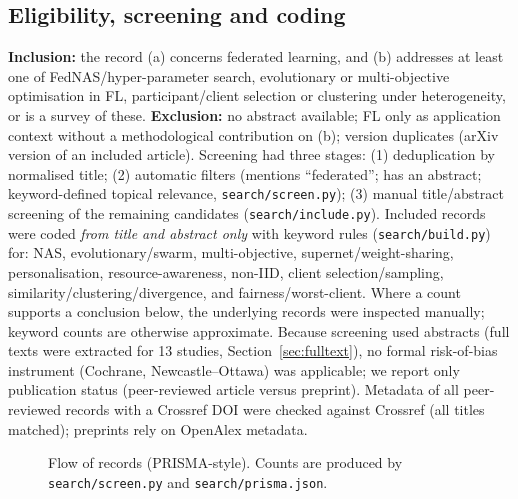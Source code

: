 \documentclass[11pt,a4paper]{article}
\begin{document}
\subsection{Eligibility, screening and coding}
\textbf{Inclusion:} the record (a) concerns federated learning, and (b) addresses at least one of FedNAS/hyper-parameter search, evolutionary or multi-objective optimisation in FL, participant/client selection or clustering under heterogeneity, or is a survey of these. \textbf{Exclusion:} no abstract available; FL only as application context without a methodological contribution on (b); version duplicates (arXiv version of an included article). Screening had three stages: (1) deduplication by normalised title; (2) automatic filters (mentions ``federated''; has an abstract; keyword-defined topical relevance, \texttt{search/screen.py}); (3) manual title/abstract screening of the \paftertopicalfilter{} remaining candidates (\texttt{search/include.py}). Included records were coded \emph{from title and abstract only} with keyword rules (\texttt{search/build.py}) for: NAS, evolutionary/swarm, multi-objective, supernet/weight-sharing, personalisation, resource-awareness, non-IID, client selection/sampling, similarity/clustering/divergence, and fairness/worst-client. Where a count supports a conclusion below, the underlying records were inspected manually; keyword counts are otherwise approximate. Because screening used abstracts (full texts were extracted for 13 studies, Section~\ref{sec:fulltext}), no formal risk-of-bias instrument (Cochrane, Newcastle--Ottawa) was applicable; we report only publication status (peer-reviewed article versus preprint). Metadata of all peer-reviewed records with a Crossref DOI were checked against Crossref (all titles matched); preprints rely on OpenAlex metadata.

\begin{figure}[H]\centering
{}
\caption{Flow of records (PRISMA-style). Counts are produced by \texttt{search/screen.py} and \texttt{search/prisma.json}.}
\end{figure}
\end{document}
